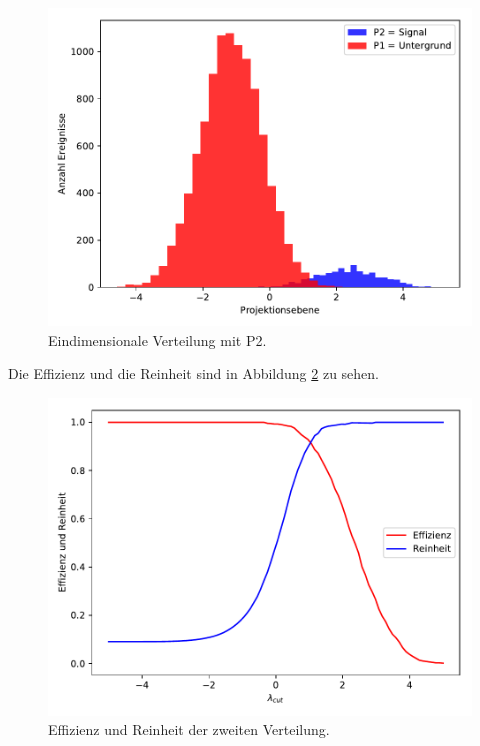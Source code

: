 \begin{figure}
  \centering
  \includegraphics[scale=0.7]{Aufgabe12/Projektionen2.pdf}
  \caption{Eindimensionale Verteilung mit P2.}
  \label{abb:5}
\end{figure}

Die Effizienz und die Reinheit sind in Abbildung \ref{abb:6} zu sehen.
\begin{figure}
  \centering
  \includegraphics[scale=0.7]{Aufgabe12/EffizienzReinheit2.pdf}
  \caption{Effizienz und Reinheit der zweiten Verteilung.}
  \label{abb:6}
\end{figure}


